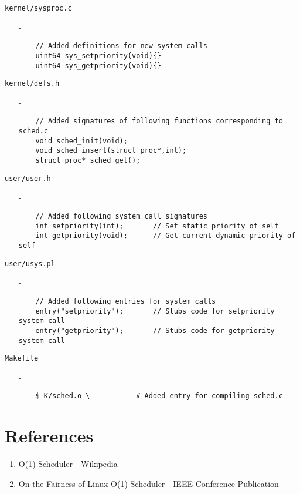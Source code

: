 \documentclass[11pt]{article}
\begin{document}
\texttt{kernel/sysproc.c}
\begin{enumerate}
    \item[-]\begin{verbatim}
    // Added definitions for new system calls
    uint64 sys_setpriority(void){}
    uint64 sys_getpriority(void){}
    \end{verbatim}
\end{enumerate}

\texttt{kernel/defs.h}
\begin{enumerate}
    \item[-]\begin{verbatim}
    // Added signatures of following functions corresponding to sched.c
    void sched_init(void);
    void sched_insert(struct proc*,int);
    struct proc* sched_get();
    \end{verbatim}
\end{enumerate}

\texttt{user/user.h}
\begin{enumerate}
    \item[-]\begin{verbatim}
    // Added following system call signatures
    int setpriority(int);       // Set static priority of self
    int getpriority(void);      // Get current dynamic priority of self
    \end{verbatim}
\end{enumerate}

\texttt{user/usys.pl}
\begin{enumerate}
    \item[-]\begin{verbatim}
    // Added following entries for system calls
    entry("setpriority");       // Stubs code for setpriority system call
    entry("getpriority");       // Stubs code for getpriority system call
    \end{verbatim}
\end{enumerate}

\texttt{Makefile}
\begin{enumerate}
    \item[-]\begin{verbatim}
    $ K/sched.o \           # Added entry for compiling sched.c
    \end{verbatim}
\end{enumerate}

\vspace{10mm}

\section{References}
\begin{enumerate}
    \item 
    \href{https://en.wikipedia.org/wiki/O(1)_scheduler}{O(1) Scheduler - Wikipedia}
    \item
    \href{https://ieeexplore.ieee.org/document/7280991}{On the Fairness of Linux O(1) Scheduler - IEEE Conference Publication}
\end{enumerate}
\end{document}
